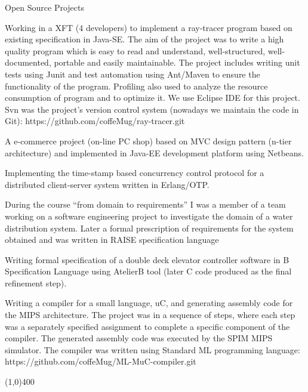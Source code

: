 \documentclass{resume}
\begin{document}
\begin{category}{Open Source Projects}

\citembullet
Working in a XFT (4 developers) to implement a ray-tracer program based on 
existing specification in Java-SE.
The aim of the project was to write a high quality program which is easy 
to read and understand, well-structured, well-documented, portable and easily maintainable.   
The project includes writing unit tests using Junit and test automation 
using Ant/Maven to ensure the functionality of the program.
Profiling also used to analyze the resource consumption of program and to optimize it. 
We use Eclipse IDE for this project.
Svn was the project's version control system (nowadays we maintain the code in Git):
https://github.com/coffeMug/ray-tracer.git

\citembullet A e-commerce project (on-line PC shop) based on MVC design 
pattern (n-tier architecture) and implemented in Java-EE development platform 
using Netbeans.

\citembullet
Implementing the time-stamp based concurrency control protocol for a 
distributed client-server system written in Erlang/OTP.

\citembullet
During the course ``from domain to requirements'' I was a member of a team 
working on a software engineering project to investigate the domain of a 
water distribution system. 
Later a formal prescription of requirements for the system obtained 
and was written in RAISE specification language

\citembullet
Writing formal specification of a double deck elevator controller 
software in B Specification Language using AtelierB tool 
(later C code produced as the final refinement step).

\citembullet Writing a compiler for a small language, uC, and generating assembly 
code for the MIPS architecture.
The project was in a sequence of steps, where each step was a separately specified 
assignment to complete a specific component of the compiler.
The generated assembly code was executed by the SPIM MIPS simulator. 
The compiler was written using Standard ML programming language:
https://github.com/coffeMug/ML-MuC-compiler.git 

\end{category}

\begin{center}
\line(1,0){400}
\end{center}

\end{document}
